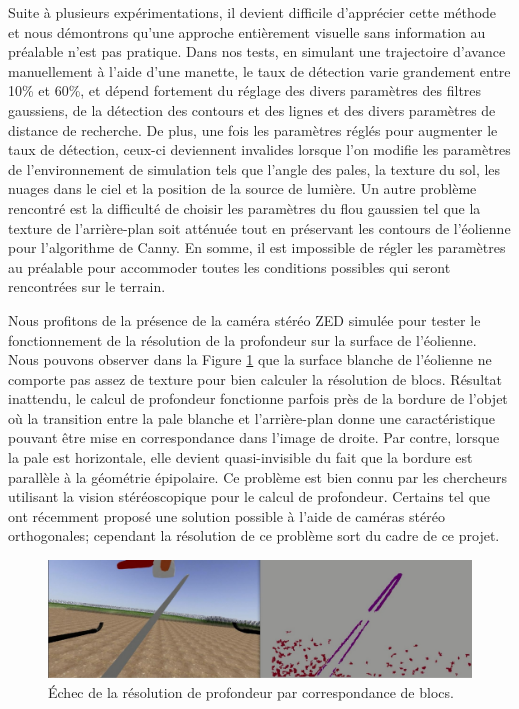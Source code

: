 Suite à plusieurs expérimentations, il devient difficile d'apprécier cette méthode et nous démontrons qu'une approche entièrement visuelle sans information au préalable n'est pas pratique. Dans nos tests, en simulant une trajectoire d'avance manuellement à l'aide d'une manette, le taux de détection varie grandement entre 10\% et 60\%, et dépend fortement du réglage des divers paramètres des filtres gaussiens, de la détection des contours et des lignes et des divers paramètres de distance de recherche. De plus, une fois les paramètres réglés pour augmenter le taux de détection, ceux-ci deviennent invalides lorsque l'on modifie les paramètres de l'environnement de simulation tels que l'angle des pales, la texture du sol, les nuages dans le ciel et la position de la source de lumière. Un autre problème rencontré est la difficulté de choisir les paramètres du flou gaussien tel que la texture de l'arrière-plan soit atténuée tout en préservant les contours de l'éolienne pour l'algorithme de Canny. En somme, il est impossible de régler les paramètres au préalable pour accommoder toutes les conditions possibles qui seront rencontrées sur le terrain.

Nous profitons de la présence de la caméra stéréo ZED simulée pour tester le fonctionnement de la résolution de la profondeur sur la surface de l'éolienne. Nous pouvons observer dans la Figure \ref{fig:stereo_fail} que la surface blanche de l'éolienne ne comporte pas assez de texture pour bien calculer la résolution de blocs. Résultat inattendu, le calcul de profondeur fonctionne parfois près de la bordure de l'objet où la transition entre la pale blanche et l'arrière-plan donne une caractéristique pouvant être mise en correspondance dans l'image de droite. Par contre, lorsque la pale est horizontale, elle devient quasi-invisible du fait que la bordure est parallèle à la géométrie épipolaire. Ce problème est bien connu par les chercheurs utilisant la vision stéréoscopique pour le calcul de profondeur. Certains tel que \citep{meier2017real} ont récemment proposé une solution possible à l'aide de caméras stéréo orthogonales; cependant la résolution de ce problème sort du cadre de ce projet.

\begin{figure}[htb]
  \includegraphics[width=\linewidth]{images/stereo_failure.jpg}
  \caption{Échec de la résolution de profondeur par correspondance de blocs.}
  \label{fig:stereo_fail}
\end{figure}

